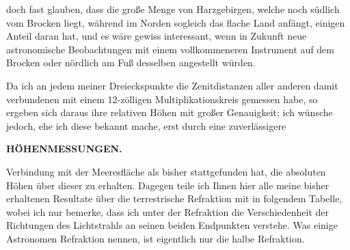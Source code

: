 doch fast glauben, dass die große Menge von Harzgebirgen, welche noch
südlich vom Brocken liegt, während im Norden sogleich das flache Land anfängt, einigen Anteil daran hat, und es wäre gewiss interessant, wenn in Zukunft neue astronomische Beobachtungen mit einem vollkommeneren Instrument
auf dem Brocken oder nördlich am Fuß desselben angestellt würden.
\par\medskip\noindent\hspace*{\parindent}Da ich an jedem meiner Dreieckspunkte die Zenitdistanzen aller anderen
damit verbundenen mit einem 12-zölligen Multiplikationskreis gemessen habe,
so ergeben sich daraus ihre relativen Höhen mit großer Genauigkeit; ich
wünsche jedoch, ehe ich diese bekannt mache, erst durch eine zuverlässigere

\par\clearpage
\noindent\null\hfill{\small\textbf{HÖHENMESSUNGEN.}}\hfill{}\par\medskip
\noindent Verbindung mit der Meeresfläche als bisher stattgefunden hat, die absoluten
Höhen über dieser zu erhalten. Dagegen teile ich Ihnen hier alle meine
bisher erhaltenen Resultate über die terrestrische Refraktion mit in folgendem
Tabelle, wobei ich nur bemerke, dass ich unter der Refraktion die Verschiedenheit der Richtungen des Lichtstrahls an seinen beiden Endpunkten
verstehe. Was einige Astronomen Refraktion nennen, ist eigentlich nur die
halbe Refraktion.
